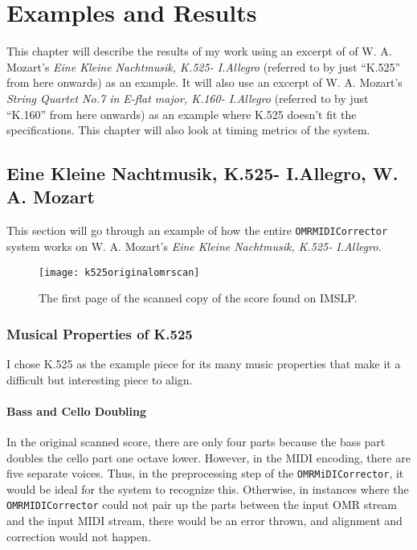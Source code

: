 \chapter{Examples and Results}
This chapter will describe the results of my work using an excerpt of of W. A. Mozart's \textit{Eine Kleine Nachtmusik, K.525- I.Allegro} (referred to by just ``K.525'' from here onwards) as an example. It will also use an excerpt of W. A. Mozart's \textit{String Quartet No.7 in E-flat major, K.160- I.Allegro} (referred to by just ``K.160'' from here onwards) as an example where K.525 doesn't fit the specifications. This chapter will also look at timing metrics of the system.

\section{Eine Kleine Nachtmusik, K.525- I.Allegro, W. A. Mozart}		
This section will go through an example of how the entire \texttt{OMRMIDICorrector} system works on W. A. Mozart's \textit{Eine Kleine Nachtmusik, K.525- I.Allegro}.

\begin{figure}[H]
\centering
\texttt{[image: k525originalomrscan]}
\caption{The first page of the scanned copy of the score found on IMSLP.}
\end{figure}

\subsection{Musical Properties of K.525}
I chose K.525 as the example piece for its many music properties that make it a difficult but interesting piece to align.

\subsubsection{Bass and Cello Doubling}
In the original scanned score, there are only four parts because the bass part doubles the cello part one octave lower. However, in the MIDI encoding, there are five separate voices. Thus, in the preprocessing step of the \texttt{OMRMiDICorrector}, it would be ideal for the system to recognize this. Otherwise, in instances where the \texttt{OMRMIDICorrector} could not pair up the parts between the input OMR stream and the input MIDI stream, there would be an error thrown, and alignment and correction would not happen. 

